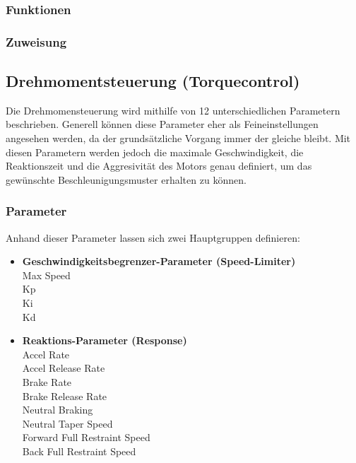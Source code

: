 \subsubsection{Funktionen}
\subsubsection{Zuweisung}

\newpage

\subsection{Drehmomentsteuerung (Torquecontrol)}
Die Drehmomensteuerung wird mithilfe von 12 unterschiedlichen Parametern beschrieben. Generell können diese Parameter eher als Feineinstellungen angesehen werden, da der grundsätzliche Vorgang immer der gleiche bleibt. Mit diesen Parametern werden jedoch die maximale Geschwindigkeit, die Reaktionszeit und die Aggresivität des Motors genau definiert, um das gewünschte Beschleunigungsmuster erhalten zu können.

\vspace{5mm}
 
\subsubsection{Parameter}
Anhand dieser Parameter lassen sich zwei Hauptgruppen definieren:
\\[5mm]
\begin{itemize}
	\item \textbf{Geschwindigkeitsbegrenzer-Parameter (Speed-Limiter)}
	\\ \medskip Max Speed
	\\ Kp
	\\ Ki
	\\ Kd
	\medskip
	\item \textbf{Reaktions-Parameter (Response)}
	\\ \medskip Accel Rate
	\\ Accel Release Rate
	\\ Brake Rate
	\\ Brake Release Rate
	\\ Neutral Braking
	\\ Neutral Taper Speed
	\\ Forward Full Restraint Speed
	\\ Back Full Restraint Speed
\end{itemize}

